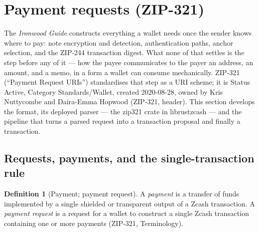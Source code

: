 \documentclass[11pt,a4paper]{article}
\theoremstyle{definition}
\newtheorem{definition}[theorem]{Definition}
\begin{document}

\section{Payment requests (ZIP-321)}\label{sec:zip321}

The \emph{Ironwood Guide} constructs everything a wallet needs once the sender
knows where to pay: note encryption and detection, authentication paths,
anchor selection, and the ZIP-244 transaction digest. What none of that
settles is the step before any of it --- how the payee communicates to the
payer an address, an amount, and a memo, in a form a wallet can consume
mechanically. ZIP-321 (``Payment Request URIs'') standardises that step as a
URI scheme; it is Status Active, Category Standards/Wallet, created
2020-08-28, owned by Kris Nuttycombe and Daira-Emma Hopwood (ZIP-321,
header). This section develops the format, its deployed parser --- the
\textsf{zip321} crate in librustzcash --- and the pipeline that turns a
parsed request into a transaction proposal and finally a transaction.

\subsection{Requests, payments, and the single-transaction rule}
\label{sec:zip321-model}

\begin{definition}[Payment; payment request]\label{def:zip321-payment}
A \emph{payment} is a transfer of funds implemented by a single shielded or
transparent output of a Zcash transaction. A \emph{payment request} is a
request for a wallet to construct a single Zcash transaction containing one
or more payments (ZIP-321, Terminology).
\end{definition}
\end{document}
